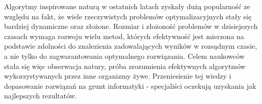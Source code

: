 Algorytmy inspirowane naturą w ostatnich latach zyskały dużą popularność ze względu na fakt,
że wiele rzeczywistych problemów optymalizacyjnych stały się bardziej dynamiczne oraz złożone.
Rozmiar i złożoność problemów w dzisiejszych czasach wymaga rozwoju wielu metod,
których efektywność jest mierzona na podstawie zdolności do znalezienia zadowalających wyników w rozsądnym czasie,
a nie tylko do zagwarantowania optymalnego rozwiązania. Celem naukowców stała się więc obserwacja natury,
próba zrozumienia efektywnych algorytmów wykorzystywanych przez inne organizmy żywe.
Przeniesienie tej wiedzy i dopasowanie rozwiązań na grunt informatyki - specjaliści oczekują uzyskania jak najlepszych rezultatów.